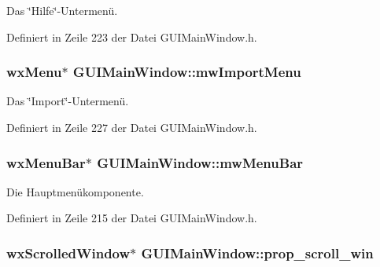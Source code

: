 Das \char`\"{}\-Hilfe\char`\"{}-\/\-Untermenü. 



Definiert in Zeile 223 der Datei G\-U\-I\-Main\-Window.\-h.

\hypertarget{classGUIMainWindow_afaff9e1bec11b0f80215ceba76e87bc4}{
\subsubsection[{mw\-Import\-Menu}]{\setlength{\rightskip}{0pt plus 5cm}wx\-Menu$\ast$ G\-U\-I\-Main\-Window\-::mw\-Import\-Menu\hspace{0.3cm}{\ttfamily [private]}}}\label{classGUIMainWindow_afaff9e1bec11b0f80215ceba76e87bc4}


Das \char`\"{}\-Import\char`\"{}-\/\-Untermenü. 



Definiert in Zeile 227 der Datei G\-U\-I\-Main\-Window.\-h.

\hypertarget{classGUIMainWindow_a057a6728bf9aa994f41060ebe15a28ac}{
\subsubsection[{mw\-Menu\-Bar}]{\setlength{\rightskip}{0pt plus 5cm}wx\-Menu\-Bar$\ast$ G\-U\-I\-Main\-Window\-::mw\-Menu\-Bar\hspace{0.3cm}{\ttfamily [private]}}}\label{classGUIMainWindow_a057a6728bf9aa994f41060ebe15a28ac}


Die Hauptmenükomponente. 



Definiert in Zeile 215 der Datei G\-U\-I\-Main\-Window.\-h.

\hypertarget{classGUIMainWindow_a1c120efb232cf3d371a3a6231619b808}{
\subsubsection[{prop\-\_\-scroll\-\_\-win}]{\setlength{\rightskip}{0pt plus 5cm}wx\-Scrolled\-Window$\ast$ G\-U\-I\-Main\-Window\-::prop\-\_\-scroll\-\_\-win\hspace{0.3cm}{\ttfamily [private]}}}\label{classGUIMainWindow_a1c120efb232cf3d371a3a6231619b808}


